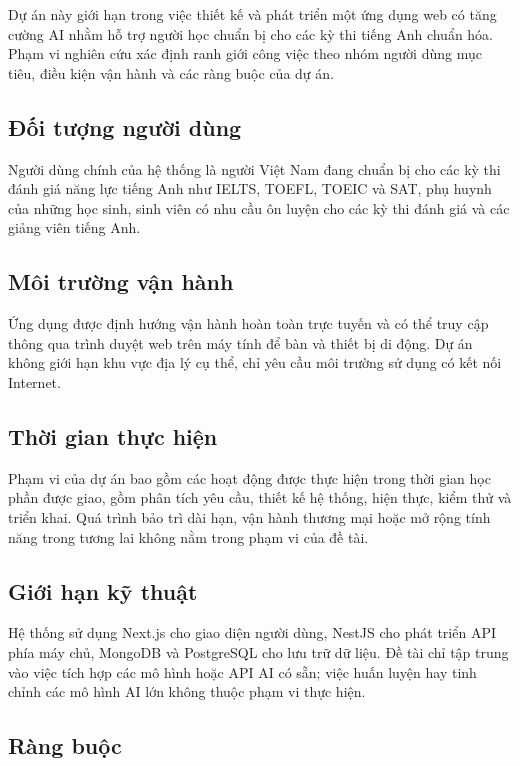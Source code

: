 Dự án này giới hạn trong việc thiết kế và phát triển một ứng dụng web có tăng cường AI nhằm hỗ trợ người học chuẩn bị cho các kỳ thi tiếng Anh chuẩn hóa. Phạm vi nghiên cứu xác định ranh giới công việc theo nhóm người dùng mục tiêu, điều kiện vận hành và các ràng buộc của dự án.

\subsection{Đối tượng người dùng}

Người dùng chính của hệ thống là người Việt Nam đang chuẩn bị cho các kỳ thi đánh giá năng lực tiếng Anh như IELTS, TOEFL, TOEIC và SAT, phụ huynh của những học sinh, sinh viên có nhu cầu ôn luyện cho các kỳ thi đánh giá và các giảng viên tiếng Anh.

\subsection{Môi trường vận hành}

Ứng dụng được định hướng vận hành hoàn toàn trực tuyến và có thể truy cập thông qua trình duyệt web trên máy tính để bàn và thiết bị di động. Dự án không giới hạn khu vực địa lý cụ thể, chỉ yêu cầu môi trường sử dụng có kết nối Internet.

\subsection{Thời gian thực hiện}

Phạm vi của dự án bao gồm các hoạt động được thực hiện trong thời gian học phần được giao, gồm phân tích yêu cầu, thiết kế hệ thống, hiện thực, kiểm thử và triển khai. Quá trình bảo trì dài hạn, vận hành thương mại hoặc mở rộng tính năng trong tương lai không nằm trong phạm vi của đề tài.

\subsection{Giới hạn kỹ thuật}

Hệ thống sử dụng Next.js \cite{nextjs_docs} cho giao diện người dùng, NestJS \cite{nestjs} cho phát triển API phía máy chủ, MongoDB \cite{mongodb} và PostgreSQL \cite{postgresql} cho lưu trữ dữ liệu. Đề tài chỉ tập trung vào việc tích hợp các mô hình hoặc API AI có sẵn; việc huấn luyện hay tinh chỉnh các mô hình AI lớn không thuộc phạm vi thực hiện.

\subsection{Ràng buộc}


